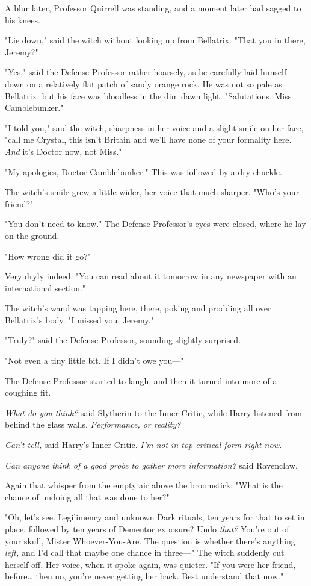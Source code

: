A blur later, Professor Quirrell was standing, and a moment later had sagged to 
his knees.

"Lie down," said the witch without looking up from Bellatrix. "That you in 
there, Jeremy?"

"Yes," said the Defense Professor rather hoarsely, as he carefully laid himself 
down on a relatively flat patch of sandy orange rock. He was not so pale as 
Bellatrix, but his face was bloodless in the dim dawn light. "Salutations, Miss 
Camblebunker."

"I told you," said the witch, sharpness in her voice and a slight smile on her 
face, "call me Crystal, this isn't Britain and we'll have none of your 
formality here. \emph{And} it's Doctor now, not Miss."

"My apologies, Doctor Camblebunker." This was followed by a dry chuckle.

The witch's smile grew a little wider, her voice that much sharper. "Who's your 
friend?"

"You don't need to know." The Defense Professor's eyes were closed, where he 
lay on the ground.

"How wrong did it go?"

Very dryly indeed: "You can read about it tomorrow in any newspaper with an 
international section."

The witch's wand was tapping here, there, poking and prodding all over 
Bellatrix's body. "I missed you, Jeremy."

"Truly?" said the Defense Professor, sounding slightly surprised.

"Not even a tiny little bit. If I didn't owe you---"

The Defense Professor started to laugh, and then it turned into more of a 
coughing fit.

\emph{What do you think?} said Slytherin to the Inner Critic, while Harry 
listened from behind the glass walls. \emph{Performance, or reality?}

\emph{Can't tell,} said Harry's Inner Critic. \emph{I'm not in top critical 
form right now.}

\emph{Can anyone think of a good probe to gather more information?} said 
Ravenclaw.

Again that whisper from the empty air above the broomstick: "What is the chance 
of undoing all that was done to her?"

"Oh, let's see. Legilimency and unknown Dark rituals, ten years for that to set 
in place, followed by ten years of Dementor exposure? Undo \emph{that?} You're 
out of your skull, Mister Whoever-You-Are. The question is whether there's 
anything \emph{left,} and I'd call that maybe one chance in three---" The witch 
suddenly cut herself off. Her voice, when it spoke again, was quieter. "If you 
were her friend, before{\ldots} then no, you're never getting her back. Best 
understand that now."

